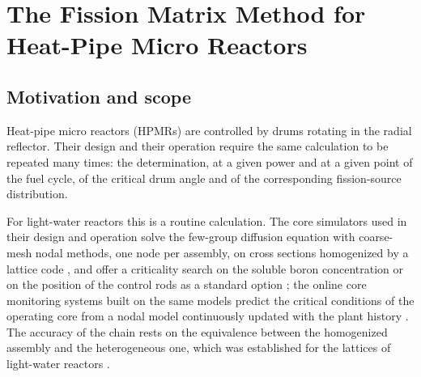 
\chapter{The Fission Matrix Method for Heat-Pipe Micro Reactors}\label{ch:fm-theory}

\section{Motivation and scope}

Heat-pipe micro reactors (HPMRs) are controlled by drums rotating in the radial
reflector. Their design and their operation require the same calculation to be
repeated many times: the determination, at a given power and at a given point
of the fuel cycle, of the critical drum angle and of the corresponding
fission-source distribution.

For light-water reactors this is a routine calculation. The core simulators
used in their design and operation solve the few-group diffusion equation with
coarse-mesh nodal methods, one node per assembly, on cross sections
homogenized by a lattice code \cite{Lawrence1986,Smith1986}, and offer a
criticality search on the soluble boron concentration or on the position of
the control rods as a standard option
\cite{Downar2010parcs,Studsvik2026simulate5,Rohde2016,Grundmann2005}; the
online core monitoring systems built on the same models predict the critical
conditions of the operating core from a nodal model continuously updated with
the plant history \cite{BoydMiller1996}. The accuracy of the chain rests on
the equivalence between the homogenized assembly and the heterogeneous one,
which was established for the lattices of light-water reactors
\cite{Smith1986}.

